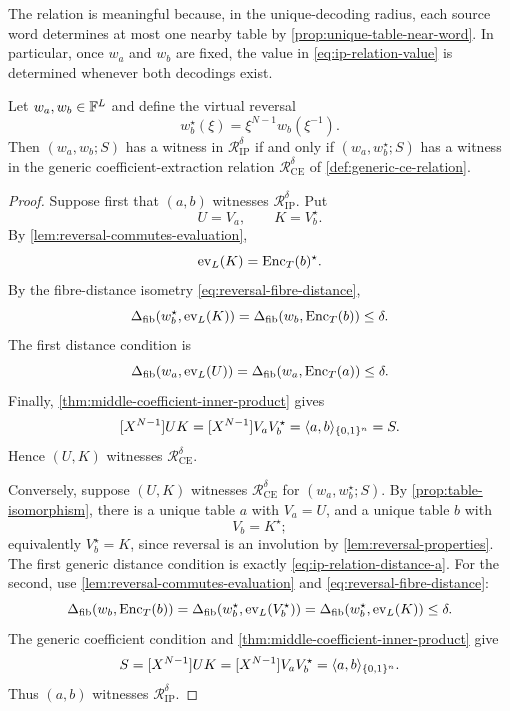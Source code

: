 The relation is meaningful because, in the unique-decoding radius, each source word determines at most one nearby table by \cref{prop:unique-table-near-word}.  In particular, once $w_a$ and $w_b$ are fixed, the value in \eqref{eq:ip-relation-value} is determined whenever both decodings exist.

\begin{lemma}
\label{lem:ip-as-generic-ce}
Let $w_a,w_b\in\mathbb{F}^L$ and define the virtual reversal
\[
  w_b^{\star}(\xi)=\xi^{N-1}w_b(\xi^{-1}).
\]
Then $(w_a,w_b;S)$ has a witness in $\mathcal R^{\delta}_{\mathrm{IP}}$ if and only if $(w_a,w_b^{\star};S)$ has a witness in the generic coefficient-extraction relation $\mathcal R^{\delta}_{\mathrm{CE}}$ of \cref{def:generic-ce-relation}.
\end{lemma}

\begin{proof}
Suppose first that $(a,b)$ witnesses $\mathcal R^{\delta}_{\mathrm{IP}}$.  Put
\[
  U=V_a,
  \qquad
  K=V_b^{\star}.
\]
By \cref{lem:reversal-commutes-evaluation},
\[
  \operatorname{ev}_L(K)=\operatorname{Enc}_T(b)^{\star}.
\]
By the fibre-distance isometry \eqref{eq:reversal-fibre-distance},
\[
  \Delta_{\mathrm{fib}}(w_b^{\star},\operatorname{ev}_L(K))
  =\Delta_{\mathrm{fib}}(w_b,\operatorname{Enc}_T(b))
  \le\delta.
\]
The first distance condition is
\[
  \Delta_{\mathrm{fib}}(w_a,\operatorname{ev}_L(U))
  =\Delta_{\mathrm{fib}}(w_a,\operatorname{Enc}_T(a))
  \le\delta.
\]
Finally, \cref{thm:middle-coefficient-inner-product} gives
\[
  [X^{N-1}]UK
  =[X^{N-1}]V_aV_b^{\star}
  =\langle a,b\rangle_{\{0,1\}^n}
  =S.
\]
Hence $(U,K)$ witnesses $\mathcal R^{\delta}_{\mathrm{CE}}$.

Conversely, suppose $(U,K)$ witnesses $\mathcal R^{\delta}_{\mathrm{CE}}$ for $(w_a,w_b^{\star};S)$.  By \cref{prop:table-isomorphism}, there is a unique table $a$ with $V_a=U$, and a unique table $b$ with
\[
  V_b=K^{\star};
\]
equivalently $V_b^{\star}=K$, since reversal is an involution by \cref{lem:reversal-properties}.  The first generic distance condition is exactly \eqref{eq:ip-relation-distance-a}.  For the second, use \cref{lem:reversal-commutes-evaluation} and \eqref{eq:reversal-fibre-distance}:
\[
  \Delta_{\mathrm{fib}}(w_b,\operatorname{Enc}_T(b))
  =\Delta_{\mathrm{fib}}(w_b^{\star},\operatorname{ev}_L(V_b^{\star}))
  =\Delta_{\mathrm{fib}}(w_b^{\star},\operatorname{ev}_L(K))
  \le\delta.
\]
The generic coefficient condition and \cref{thm:middle-coefficient-inner-product} give
\[
  S=[X^{N-1}]UK
   =[X^{N-1}]V_aV_b^{\star}
   =\langle a,b\rangle_{\{0,1\}^n}.
\]
Thus $(a,b)$ witnesses $\mathcal R^{\delta}_{\mathrm{IP}}$.
\end{proof}

